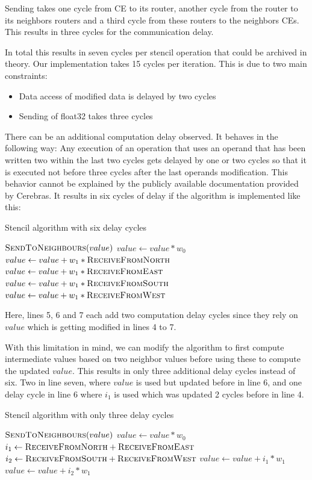 \documentclass{article}
\begin{document}
Sending takes one cycle from CE to its router, another cycle from the router to its neighbors routers and a third cycle from these routers to the neighbors CEs. This results in three cycles for the communication delay.

In total this results in seven cycles per stencil operation that could be archived in theory. Our implementation takes 15 cycles per iteration. This is due to two main constraints:
\begin{itemize}
    \item Data access of modified data is delayed by two cycles
    \item Sending of float32 takes three cycles
\end{itemize}
There can be an additional computation delay observed. It behaves in the following way: Any execution of an operation that uses an operand that has been written two within the last two cycles gets delayed by one or two cycles so that it is executed not before three cycles after the last operands modification. This behavior cannot be explained by the publicly available documentation provided by Cerebras. It results in six cycles of delay if the algorithm is implemented like this:
\begin{algorithm}
\caption{Stencil algorithm with six delay cycles}
\begin{algorithmic}[1]
\State $\Call{SendToNeighbours}{value}$
\State $value \gets value*w_0$
\State $value\gets value + w_1*\Call{ReceiveFromNorth}{}$
\State $value\gets value + w_1*\Call{ReceiveFromEast}{}$
\State $value\gets value + w_1*\Call{ReceiveFromSouth}{}$
\State $value\gets value + w_1*\Call{ReceiveFromWest}{}$
\EndProcedure
\end{algorithmic}
\end{algorithm}
Here, lines 5, 6 and 7 each add two computation delay cycles since they rely on $value$ which is getting modified in lines 4 to 7.

With this limitation in mind, we can modify the algorithm to first compute intermediate values based on two neighbor values before using these to compute the updated $value$. This results in only three additional delay cycles instead of six. Two in line seven, where $value$ is used but updated before in line 6, and one delay cycle in line 6 where $i_1$ is used which was updated 2 cycles before in line 4.
\begin{algorithm}
\caption{Stencil algorithm with only three delay cycles}
\begin{algorithmic}[1]
\State $\Call{SendToNeighbours}{value}$
\State $value \gets value*w_0$
\State $i_1 \gets \Call{ReceiveFromNorth}{} + \Call{ReceiveFromEast}{}$
\State $i_2 \gets \Call{ReceiveFromSouth}{} + \Call{ReceiveFromWest}{}$
\State $value \gets value +i_1*w_1$
\State $value \gets value +i_2*w_1$
\EndProcedure
\end{algorithmic}
\end{algorithm}
\end{document}
